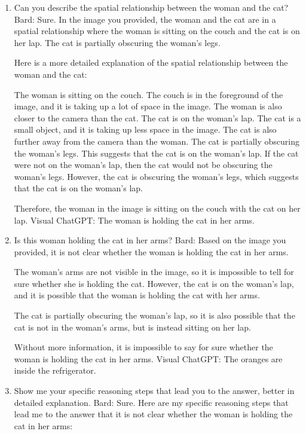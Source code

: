 \begin{enumerate}
    \item Can you describe the spatial relationship between the woman and the cat?
    \subitem Bard: 
    Sure. In the image you provided, the woman and the cat are in a spatial relationship where the woman is sitting on the couch and the cat is on her lap. The cat is partially obscuring the woman's legs.
    
    Here is a more detailed explanation of the spatial relationship between the woman and the cat:
    
    The woman is sitting on the couch. The couch is in the foreground of the image, and it is taking up a lot of space in the image. The woman is also closer to the camera than the cat.
    The cat is on the woman's lap. The cat is a small object, and it is taking up less space in the image. The cat is also further away from the camera than the woman.
    The cat is partially obscuring the woman's legs. This suggests that the cat is on the woman's lap.
    If the cat were not on the woman's lap, then the cat would not be obscuring the woman's legs. However, the cat is obscuring the woman's legs, which suggests that the cat is on the woman's lap.
    
    Therefore, the woman in the image is sitting on the couch with the cat on her lap.
    \subitem Visual ChatGPT: The woman is holding the cat in her arms.
    \item Is this woman holding the cat in her arms?
    \subitem Bard: 
    Based on the image you provided, it is not clear whether the woman is holding the cat in her arms.
    
    The woman's arms are not visible in the image, so it is impossible to tell for sure whether she is holding the cat. However, the cat is on the woman's lap, and it is possible that the woman is holding the cat with her arms.
    
    The cat is partially obscuring the woman's lap, so it is also possible that the cat is not in the woman's arms, but is instead sitting on her lap.
    
    Without more information, it is impossible to say for sure whether the woman is holding the cat in her arms.
    \subitem Visual ChatGPT: The oranges are inside the refrigerator.
    \item Show me your specific reasoning steps that lead you to the answer, better in detailed explanation.
    \subitem Bard: Sure. Here are my specific reasoning steps that lead me to the answer that it is not clear whether the woman is holding the cat in her arms:


\end{enumerate}
